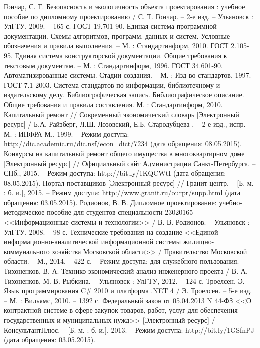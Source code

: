 \renewcommand{\refname}{Список использованных источников}

\begin{thebibliography}{99}
	 Гончар, С. Т. Безопасность и экологичность объекта проектирования : учебное пособие по дипломному проектированию / С. Т. Гончар. – 2-е изд. – Ульяновск : УлГТУ, 2009. – 165 с.
	 ГОСТ 19.701-90. Единая система программной документации. Схемы алгоритмов, программ, данных и систем. Условные обозначения и правила выполнения. – М. : Стандартинформ, 2010.
	 ГОСТ 2.105-95. Единая система конструкторской документации. Общие требования к текстовым документам. – М. : Стандартинформ, 1996.
	 ГОСТ 34.601-90. Автоматизированные системы. Стадии создания. – М. : Изд-во стандартов, 1997.
	 ГОСТ 7.1-2003. Система стандартов по информации, библиотечному и издательскому делу. Библиографическая запись. Библиографическое описание. Общие требования и правила составления.  М. : Стандартинформ, 2010.
	 Капитальный ремонт // Современный экономический словарь [Электронный ресурс] / Б.А. Райзберг, Л.Ш. Лозовский, Е.Б. Стародубцева . – 2-е изд., испр. – М. : ИНФРА-М., 1999. – Режим доступа: http://dic.academic.ru/dic.nsf/econ\_dict/7234 (дата обращения: 08.05.2015).
	 Конкурсы на капитальный ремонт общего имущества в многоквартирном доме [Электронный ресурс] // Официальный сайт Администрации Санкт-Петербурга. – СПб., 2015. – Режим доступа: http://bit.ly/1KQCWtI (дата обращения: 08.05.2015).
	 Портал поставщиков [Электронный ресурс] // Гранит-центр. – [Б. м. : б. и.], 2015. – Режим доступа: http://www.granit.ru/ourpr/supp.html (дата обращения: 03.05.2015).
	 Родионов, В. В. Дипломное проектирование: учебно-методическое пособие для студентов специальности 23020165 <<Информационные системы и технологии>> / В. В. Родионов. – Ульяновск : УлГТУ, 2008. – 98 с.
	 Технические требования на создание <<Единой информационно-аналитической информационной системы жилищно-коммунального хозяйства Московской области>> / Правительство Московской области. – М., 2014. – 422 с. – Режим доступа: для служебного пользования.
	 Тихоненков, В. А. Технико-экономический анализ инженерного проекта / В. А. Тихоненков, М. В. Рыбкина. – Ульяновск : УлГТУ, 2012. – 124 с.
	 Троелсен, Э. Язык программирования C\# 2010 и платформа .NET 4 / Э. Троелсен. – 5-е изд. – М. : Вильямс, 2010. – 1392 с.
	 Федеральный закон от 05.04.2013 N 44-ФЗ <<О контрактной системе в сфере закупок товаров, работ, услуг для обеспечения государственных и муниципальных нужд>> [Электронный ресурс] / КонсультантПлюс. – [Б. м. : б. и.], 2013. – Режим доступа: http://bit.ly/1GSfnPJ (дата обращения: 03.05.2015).

\end{thebibliography}
